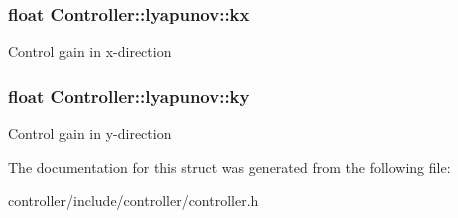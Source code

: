 \subsubsection[{\texorpdfstring{kx}{kx}}]{\setlength{\rightskip}{0pt plus 5cm}float Controller\+::lyapunov\+::kx}\hypertarget{structController_1_1lyapunov_a56b832234c79347ed03bdfa1f88aa530}{}\label{structController_1_1lyapunov_a56b832234c79347ed03bdfa1f88aa530}
Control gain in x-\/direction 
\subsubsection[{\texorpdfstring{ky}{ky}}]{\setlength{\rightskip}{0pt plus 5cm}float Controller\+::lyapunov\+::ky}\hypertarget{structController_1_1lyapunov_a3790be122f461506e1b7a30d8a2316a4}{}\label{structController_1_1lyapunov_a3790be122f461506e1b7a30d8a2316a4}
Control gain in y-\/direction 

The documentation for this struct was generated from the following file\+:\begin{DoxyCompactItemize}
\item 
controller/include/controller/controller.\+h\end{DoxyCompactItemize}
